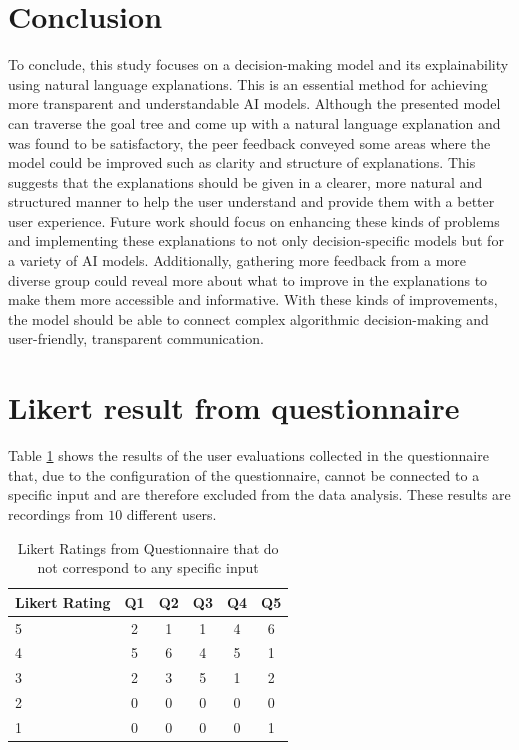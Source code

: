 \documentclass[sigconf,nonacm]{acmart}
\begin{document}
\section{Conclusion} \label{sec:conclusion}

To conclude, this study focuses on a decision-making model and its explainability using natural language explanations. This is an essential method for achieving more transparent and understandable AI models. Although the presented model can traverse the goal tree and come up with a natural language explanation and was found to be satisfactory, the peer feedback conveyed some areas where the model could be improved such as clarity and structure of explanations. This suggests that the explanations should be given in a clearer, more natural and structured manner to help the user understand and provide them with a better user experience. Future work should focus on enhancing these kinds of problems and implementing these explanations to not only decision-specific models but for a variety of AI models. Additionally, gathering more feedback from a more diverse group could reveal more about what to improve in the explanations to make them more accessible and informative. With these kinds of improvements, the model should be able to connect complex algorithmic decision-making and user-friendly, transparent communication.

\newpage
\appendix
\section{Likert result from questionnaire} \label{app:likert}

Table \ref{tab:likert_unused} shows the results of the user evaluations collected in the questionnaire that, due to the configuration of the questionnaire, cannot be connected to a specific input and are therefore excluded from the data analysis. These results are recordings from $10$ different users.


\begin{table}[h]
    \centering
    \begin{tabular}{lccccc}
        \toprule
        Likert Rating & Q1 & Q2 & Q3 & Q4 & Q5 \\
        \midrule
        5 & 2 & 1 & 1 & 4 &  6 \\
        4 & 5 & 6 & 4 & 5 & 1 \\
        3 & 2 & 3 & 5 & 1 & 2 \\
        2 & 0 & 0 & 0 & 0 & 0 \\
        1 & 0 & 0 & 0 & 0 & 1 \\
        \bottomrule
    \end{tabular}
    \caption{Likert Ratings from Questionnaire that do not correspond to any specific input}
    \label{tab:likert_unused}
\end{table}
\end{document}
